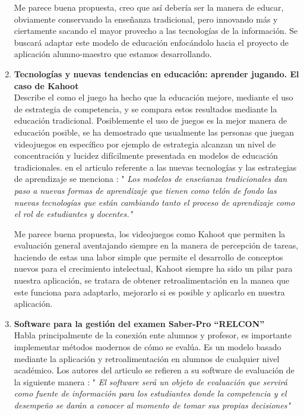\documentclass[12pt]{book}
\begin{document}
\begin{enumerate}
	    {\normalsize Me parece buena propuesta, creo que así debería ser la manera de educar, obviamente conservando la enseñanza tradicional, pero innovando más y ciertamente sacando el mayor provecho a las tecnologías de la información. Se buscará adaptar este modelo de educación enfocándolo hacia el proyecto de aplicación alumno-maestro que estamos desarrollando.}
	    
	    \item \textbf{Tecnologías y nuevas tendencias en educación: aprender jugando. El caso de Kahoot \\}
	    {\normalsize Describe el como el juego ha hecho que la
	    	educación mejore, mediante el uso de estrategia de
	    	competencia, y se compara estos resultados mediante la
	    	educación tradicional. Posiblemente el uso de juegos es la mejor manera
	    	de educación posible, se ha demostrado que usualmente las
	    	personas que juegan videojuegos en específico por ejemplo
	    	de estrategia alcanzan un nivel de concentración
	    	y lucidez difícilmente presentada en modelos de educación
	    	tradicionales. \cite{navarro2017tecnologias} en el articulo referente a las nuevas tecnologías y las estrategias de aprendizaje se menciona : " \textit{ Los  modelos  de enseñanza  tradicionales  dan  paso a  nuevas  formas  de  aprendizaje que tienen   como   telón   de   fondo   las   nuevas   tecnologías   que   están cambiando tanto el proceso de aprendizaje como el rol de estudiantes y docentes." }} 
	    
	    {\normalsize Me parece buena propuesta, los videojuegos como
	    	Kahoot que permiten la evaluación general aventajando
	    	siempre en la manera de percepción de tareas, haciendo de
	    	estas una labor simple que permite el desarrollo de conceptos
	    	nuevos para el crecimiento intelectual, Kahoot siempre ha sido un pilar para nuestra aplicación, se tratara de obtener retroalimentación en la
	    	manea que este funciona para adaptarlo, mejorarlo si es
	    	posible y aplicarlo en nuestra aplicación.}
    	
    	 \item \textbf{Software para la gestión del examen Saber-Pro “RELCON”\\}
    	{\normalsize Habla principalmente de la conexión ente alumnos y profesor, es
    		importante implementar métodos modernos de cómo se evalúa. Es un modelo basado mediante la aplicación y retroalimentación en alumnos de cualquier nivel académico. \cite{lopez2012software} Los autores del articulo se refieren a su software de evaluación de la siguiente manera : " \textit{ El software será un objeto de evaluación que servirá como fuente de información para los estudiantes donde la competencia y el desempeño se darán a conocer al momento de tomar sus propias decisiones" }} 
    	

\end{enumerate}
\end{document}
